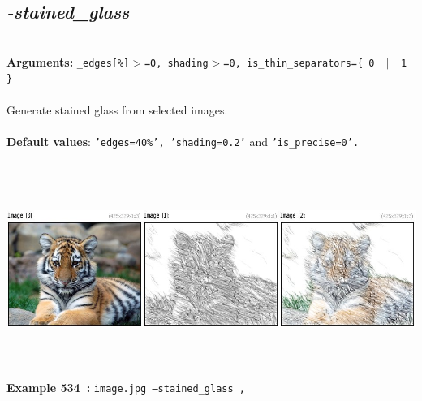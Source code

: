 \documentclass[a4paper,11pt,twoside]{book}
\begin{document}
\subsection{\emph{-stained\_glass} }\vspace*{-0.5em}
~\\\textbf{Arguments: } 
{\small \texttt{\_edges[\%]$>$=0, shading$>$=0, is\_thin\_separators=\{ 0 ~$|$~ 1 \}}}\\~\\
Generate stained glass from selected images.
~\\~\\\textbf{Default values}: {\small \texttt{'edges=40\%', 'shading=0.2'} and \texttt{'is\_precise=0'.}}
\begin{center}\includegraphics[keepaspectratio=true,height=7cm,width=\textwidth]{img/gmic_def534.jpg}\\
{\footnotesize \textbf{Example 534~:} \texttt{image.jpg --stained\_glass ,}}
\end{center}
\end{document}
